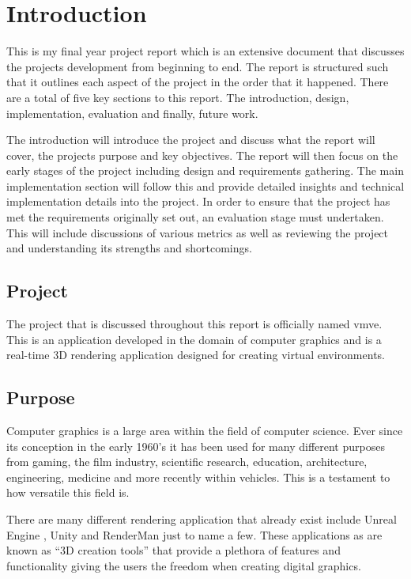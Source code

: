 \documentclass[11pt]{article}
\begin{document}
\pagebreak

\pagestyle{fancy}

\section{Introduction}
This is my final year project report which is an extensive document that
discusses the projects development from beginning to end. The report is
structured such that it outlines each aspect of the project in the order that it
happened. There are a total of five key sections to this report. The
introduction, design, implementation, evaluation and finally, future work.

The introduction will introduce the project and discuss what the report will
cover, the projects purpose and key objectives. The report will then focus on
the early stages of the project including design and requirements gathering. The
main implementation section will follow this and provide detailed insights and
technical implementation details into the project. In order to ensure that the
project has met the requirements originally set out, an evaluation stage must
undertaken. This will include discussions of various metrics as well as
reviewing the project and understanding its strengths and shortcomings.

\subsection{Project}
The project that is discussed throughout this report is officially named
\gls{vmve}. This is an application developed in the domain of computer
graphics and is a real-time 3D rendering application designed for creating virtual
environments.  

\subsection{Purpose}
Computer graphics is a large area within the field of computer science. Ever
since its conception in the early 1960's it has been used for many different
purposes from gaming, the film industry, scientific research, education,
architecture, engineering, medicine and more recently within vehicles. This is a
testament to how versatile this field is.

There are many different rendering application that already exist include Unreal
Engine \cite{unreal_engine}, Unity \cite{unity} and RenderMan \cite{render_man}
just to name a few. These applications as are known as ``3D creation tools''
that provide a plethora of features and functionality giving the users the
freedom when creating digital graphics.
\end{document}

